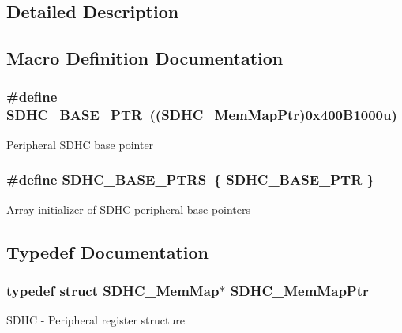 \subsection{Detailed Description}


\subsection{Macro Definition Documentation}
\hypertarget{group___s_d_h_c___peripheral_gaf6d94732d48040eef799143f86be859c}{}
\subsubsection[{S\+D\+H\+C\+\_\+\+B\+A\+S\+E\+\_\+\+P\+T\+R}]{\setlength{\rightskip}{0pt plus 5cm}\#define S\+D\+H\+C\+\_\+\+B\+A\+S\+E\+\_\+\+P\+T\+R~(({\bf S\+D\+H\+C\+\_\+\+Mem\+Map\+Ptr})0x400\+B1000u)}\label{group___s_d_h_c___peripheral_gaf6d94732d48040eef799143f86be859c}
Peripheral S\+D\+H\+C base pointer \hypertarget{group___s_d_h_c___peripheral_gaba68469bfde58472af9853b68fee61de}{}
\subsubsection[{S\+D\+H\+C\+\_\+\+B\+A\+S\+E\+\_\+\+P\+T\+R\+S}]{\setlength{\rightskip}{0pt plus 5cm}\#define S\+D\+H\+C\+\_\+\+B\+A\+S\+E\+\_\+\+P\+T\+R\+S~\{ {\bf S\+D\+H\+C\+\_\+\+B\+A\+S\+E\+\_\+\+P\+T\+R} \}}\label{group___s_d_h_c___peripheral_gaba68469bfde58472af9853b68fee61de}
Array initializer of S\+D\+H\+C peripheral base pointers 

\subsection{Typedef Documentation}
\hypertarget{group___s_d_h_c___peripheral_ga6da8531f7cf8afb4899b93b54ac58054}{}
\subsubsection[{S\+D\+H\+C\+\_\+\+Mem\+Map\+Ptr}]{\setlength{\rightskip}{0pt plus 5cm}typedef struct {\bf S\+D\+H\+C\+\_\+\+Mem\+Map}$\ast$ {\bf S\+D\+H\+C\+\_\+\+Mem\+Map\+Ptr}}\label{group___s_d_h_c___peripheral_ga6da8531f7cf8afb4899b93b54ac58054}
S\+D\+H\+C -\/ Peripheral register structure 
